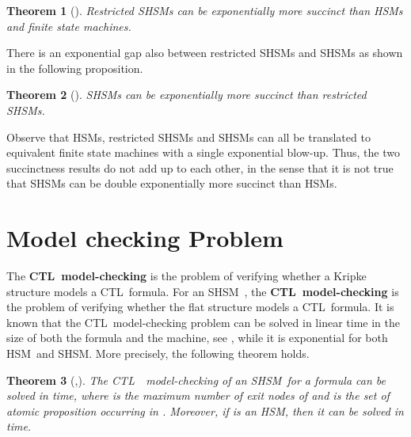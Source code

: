 \documentclass[letterpaper,twocolumn,10pt]{article}
\newtheorem{theorem}{Theorem}
\newtheorem{corollary}{Corollary}
\newcommand{\ignore}[1]{}
\def    \ctl        {\mbox{\textsc{CTL }\xspace}}
\newcommand{\VHSM}{SHSM}
\newcommand{\HSM}{HSM}
\newcommand{\CHSM}{restricted \VHSM}
\begin{document}
\begin{theorem}[\cite{LNPP08}]\label{theo:succintezza1}
Restricted \VHSM s can be exponentially more succinct than
\HSM s and finite state machines.
\end{theorem}

There is an exponential gap also between \CHSM s and \VHSM s as
shown in the following proposition.

\begin{theorem}[\cite{LNPP08}]
\VHSM s can be exponentially more succinct than \CHSM s.
\end{theorem}

Observe that  \HSM s, \CHSM s and \VHSM s can all be
translated to equivalent finite state machines with a single exponential
blow-up. Thus, the two succinctness results do not add up to each other, in the
sense that it is not true that \VHSM s can be double exponentially more
succinct than \HSM s.
\ignore{
From Proposition~\ref{theo:succintezza1} and the fact that any
\CHSM\ is also an \VHSM, we have the following.
\begin{corollary}
\VHSM s can be exponentially more succinct than
\HSM s and finite state machines.
\end{corollary}

}



\section{Model checking Problem}\label{sec:Algo}
The \textbf{\ctl model-checking} is the problem of verifying
whether a Kripke structure  models a \ctl formula.
For an \VHSM\ ,  the \textbf{\ctl model-checking} is the problem of verifying
whether the flat structure  models a \ctl formula.
It is known that the \ctl model-checking problem can be solved in
linear time  in the size of both the formula and  the machine,
see \cite{CE82}, while it is exponential for both  \HSM\ and \VHSM.
More precisely, the following theorem holds.


\begin{theorem}[\cite{AY01},\cite{LNPP08}]\label{theo:ctlMc}
The \ctl\ model-checking  of an \VHSM\  for a formula  can be solved in
 time, where  is the maximum number of exit
nodes of  and  is the set of atomic proposition occurring in . Moreover, if  is an \HSM, then it can be solved in
  time.
\end{theorem}
\end{document}
